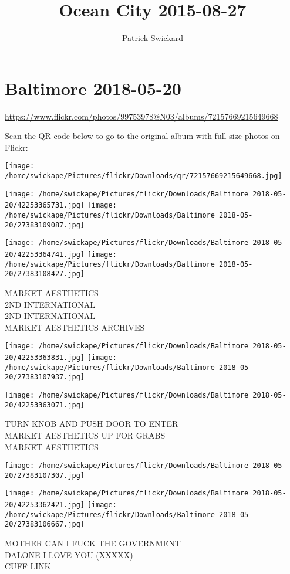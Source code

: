 \documentclass[10pt,letterpaper]{article}
\title{Ocean City 2015-08-27}
\author{Patrick Swickard}
\date{}
\begin{document}
\section*{Baltimore 2018-05-20}

\url{https://www.flickr.com/photos/99753978@N03/albums/72157669215649668}

Scan the QR code below to go to the original album with full-size photos on Flickr:

\texttt{[image: /home/swickape/Pictures/flickr/Downloads/qr/72157669215649668.jpg]}
\pagebreak

\texttt{[image: /home/swickape/Pictures/flickr/Downloads/Baltimore 2018-05-20/42253365731.jpg]}
\texttt{[image: /home/swickape/Pictures/flickr/Downloads/Baltimore 2018-05-20/27383109087.jpg]}

\texttt{[image: /home/swickape/Pictures/flickr/Downloads/Baltimore 2018-05-20/42253364741.jpg]}
\texttt{[image: /home/swickape/Pictures/flickr/Downloads/Baltimore 2018-05-20/27383108427.jpg]}

MARKET AESTHETICS\\
2ND INTERNATIONAL\\
2ND INTERNATIONAL\\
MARKET AESTHETICS ARCHIVES
\pagebreak

\texttt{[image: /home/swickape/Pictures/flickr/Downloads/Baltimore 2018-05-20/42253363831.jpg]}
\texttt{[image: /home/swickape/Pictures/flickr/Downloads/Baltimore 2018-05-20/27383107937.jpg]}

\texttt{[image: /home/swickape/Pictures/flickr/Downloads/Baltimore 2018-05-20/42253363071.jpg]}

TURN KNOB AND PUSH DOOR TO ENTER\\
MARKET AESTHETICS UP FOR GRABS\\
MARKET AESTHETICS
\pagebreak

\texttt{[image: /home/swickape/Pictures/flickr/Downloads/Baltimore 2018-05-20/27383107307.jpg]}

\vspace{0.25in}
\texttt{[image: /home/swickape/Pictures/flickr/Downloads/Baltimore 2018-05-20/42253362421.jpg]}
\texttt{[image: /home/swickape/Pictures/flickr/Downloads/Baltimore 2018-05-20/27383106667.jpg]}

MOTHER CAN I FUCK THE GOVERNMENT\\
DALONE I LOVE YOU (XXXXX)\\
CUFF LINK
\pagebreak
\end{document}
